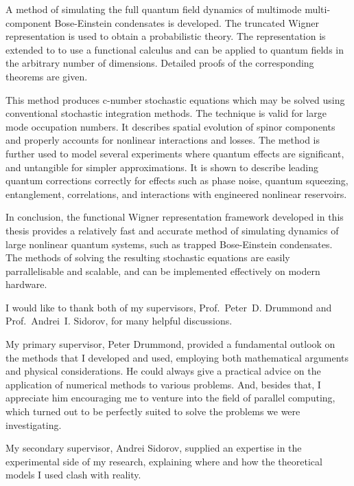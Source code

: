 A method of simulating the full quantum field dynamics of multimode multi-component Bose-Einstein condensates is developed.
The truncated Wigner representation is used to obtain a probabilistic theory.
The representation is extended to to use a functional calculus and can be applied to quantum fields in the arbitrary number of dimensions.
Detailed proofs of the corresponding theorems are given.

This method produces c-number stochastic equations which may be solved using conventional stochastic integration methods.
The technique is valid for large mode occupation numbers.
It describes spatial evolution of spinor components and properly accounts for nonlinear interactions and losses.
The method is further used to model several experiments where quantum effects are significant, and untangible for simpler approximations.
It is shown to describe leading quantum corrections correctly for effects such as phase noise, quantum squeezing, entanglement,  correlations, and interactions with engineered nonlinear reservoirs.

In conclusion, the functional Wigner representation framework developed in this thesis provides a relatively fast and accurate method of simulating dynamics of large nonlinear quantum systems, such as trapped Bose-Einstein condensates.
The methods of solving the resulting stochastic equations are easily parrallelisable and scalable, and can be implemented effectively on modern hardware.


\cleardoublepage


I would like to thank both of my supervisors, Prof.~Peter~D. Drummond and Prof.~Andrei~I. Sidorov, for many helpful discussions.

My primary supervisor, Peter Drummond, provided a fundamental outlook on the methods that I developed and used, employing both mathematical arguments and physical considerations.
He could always give a practical advice on the application of numerical methods to various problems.
And, besides that, I appreciate him encouraging me to venture into the field of parallel computing, which turned out to be perfectly suited to solve the problems we were investigating.

My secondary supervisor, Andrei Sidorov, supplied an expertise in the experimental side of my research, explaining where and how the theoretical models I used clash with reality.

